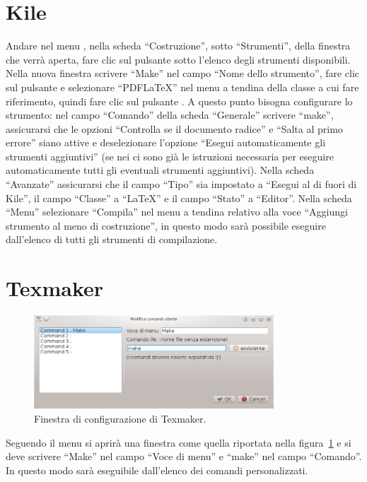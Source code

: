 \section{Kile}
\label{sec:kile}

Andare nel menu , nella scheda
``Costruzione'', sotto ``Strumenti'', della finestra che verrà aperta, fare clic
sul pulsante  sotto l'elenco degli strumenti disponibili.
Nella nuova finestra scrivere ``Make'' nel campo ``Nome dello strumento'', fare
clic sul pulsante  e selezionare ``PDFLaTeX'' nel menu a
tendina della classe a cui fare riferimento, quindi fare clic sul pulsante
.  A questo punto bisogna configurare lo strumento: nel campo
``Comando'' della scheda ``Generale'' scrivere ``make'', assicurarsi che le
opzioni ``Controlla se il documento radice'' e ``Salta al primo errore'' siano
attive e deselezionare l'opzione ``Esegui automaticamente gli strumenti
aggiuntivi'' (se nei  ci sono già le istruzioni necessaria
per eseguire automaticamente tutti gli eventuali strumenti aggiuntivi).  Nella
scheda ``Avanzate'' assicurarsi che il campo ``Tipo'' sia impostato a ``Esegui
al di fuori di Kile'', il campo ``Classe'' a ``LaTeX'' e il campo ``Stato'' a
``Editor''.  Nella scheda ``Menu'' selezionare ``Compila'' nel menu a tendina
relativo alla voce ``Aggiungi strumento al meno di costruzione'', in questo modo
sarà possibile eseguire  dall'elenco di tutti gli strumenti di
compilazione.

\section{Texmaker}
\label{sec:texmaker}

\begin{figure}
  \centering
  \includegraphics[width=0.8\textwidth]{figure/texmaker}
  \caption{Finestra di configurazione di Texmaker.}
  \label{fig:texmaker}
\end{figure}
Seguendo il menu
 si aprirà una
finestra come quella riportata nella figura~\ref{fig:texmaker} e si deve
scrivere ``Make'' nel campo ``Voce di menu'' e ``make'' nel campo ``Comando''.
In questo modo  sarà eseguibile dall'elenco dei comandi
personalizzati.

